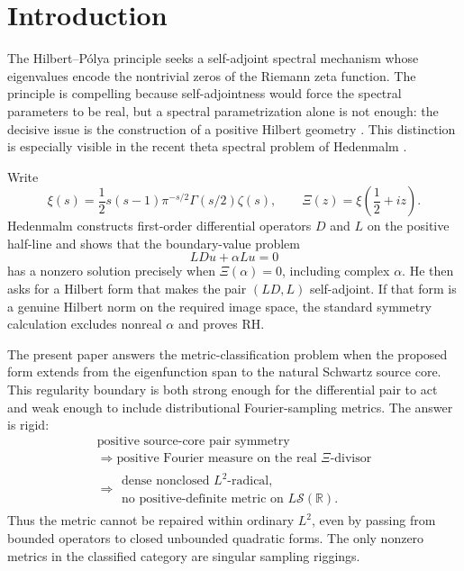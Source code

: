 \documentclass[11pt]{article}
\newcommand{\R}{\mathbb R}
\newcommand{\cS}{\mathcal S}
\begin{document}
\section{Introduction}

The Hilbert--Pólya principle seeks a self-adjoint spectral mechanism whose eigenvalues encode the
nontrivial zeros of the Riemann zeta function.  The principle is compelling because
self-adjointness would force the spectral parameters to be real, but a spectral
parametrization alone is not enough: the decisive issue is the construction of a positive
Hilbert geometry \cite{Lagarias2006,Connes2026}.  This distinction is especially visible in the
recent theta spectral problem of Hedenmalm \cite{Hedenmalm2026}.

Write
\[
 \xi(s)=\frac12s(s-1)\pi^{-s/2}\Gamma(s/2)\zeta(s),
 \qquad
 \Xi(z)=\xi\!\left(\frac12+iz\right).
 \tag{1.1}
\]
Hedenmalm constructs first-order differential operators \(D\) and \(L\) on the positive
half-line and shows that the boundary-value problem
\[
 LDu+\alpha Lu=0
 \tag{1.2}
\]
has a nonzero solution precisely when \(\Xi(\alpha)=0\), including complex \(\alpha\).
He then asks for a Hilbert form that makes the pair \((LD,L)\) self-adjoint.  If that form is a
genuine Hilbert norm on the required image space, the standard symmetry calculation excludes
nonreal \(\alpha\) and proves RH.

The present paper answers the metric-classification problem when the proposed form extends from
the eigenfunction span to the natural Schwartz source core.  This regularity boundary is both
strong enough for the differential pair to act and weak enough to include distributional
Fourier-sampling metrics.  The answer is rigid:
\[
\boxed{
\begin{gathered}
\text{positive source-core pair symmetry}\\
\Longrightarrow
\text{positive Fourier measure on the real \(\Xi\)-divisor}\\
\Longrightarrow
\begin{matrix}
\text{dense nonclosed \(L^2\)-radical},\\
\text{no positive-definite metric on \(L\cS(\R)\)}.
\end{matrix}
\end{gathered}}
\tag{1.3}
\]
Thus the metric cannot be repaired within ordinary \(L^2\), even by passing from bounded
operators to closed unbounded quadratic forms.  The only nonzero metrics in the classified
category are singular sampling riggings.
\end{document}
